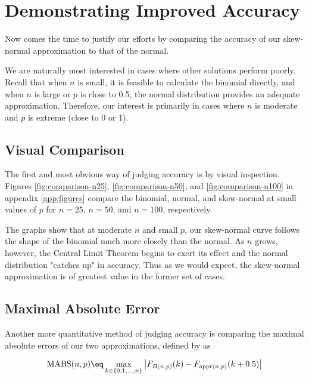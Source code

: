 \section{Demonstrating Improved Accuracy}
\label{sec:accuracy}

Now comes the time to justify our efforts by comparing the accuracy of our
skew-normal approximation to that of the normal.

We are naturally most interested in cases where other solutions perform poorly.
Recall that when $n$ is small, it is feasible to calculate the binomial
directly, and when $n$ is large or $p$ is close to 0.5, the normal distribution
provides an adequate approximation. Therefore, our interest is primarily in
cases where $n$ is moderate and $p$ is extreme (close to 0 or 1).\footnotemark


\subsection{Visual Comparison}

The first and most obvious way of judging accuracy is by visual inspection.
Figures \ref{fig:comparison-n25}, \ref{fig:comparison-n50}, and
\ref{fig:comparison-n100} in appendix \ref{app:figures} compare the binomial,
normal, and skew-normal at small values of $p$ for $n=25$, $n=50$, and $n=100$,
respectively.

The graphs show that at moderate $n$ and small $p$, our skew-normal curve
follows the shape of the binomial much more closely than the normal. As $n$
grows, however, the Central Limit Theorem begins to exert its effect and the
normal distribution "catches up" in accuracy. Thus as we would expect, the
skew-normal approximation is of greatest value in the former set of cases.

\subsection{Maximal Absolute Error}
\label{subsec:mabs}

Another more quantitative method of judging accuracy is comparing the maximal
absolute errors of our two approximations, defined by \citet{mabs} as

\begin{equation}
  \textnormal{MABS}(n, p) \eq \max_{k \in \{0, 1,...,n\}} \left| F_{B(n,p)} (k) -  F_{\textnormal{appr}(n,p)}(k + 0.5) \right|
\end{equation}

